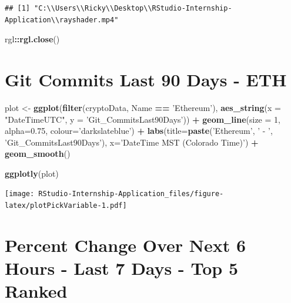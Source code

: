 \documentclass[
]{book}
\newenvironment{Shaded}{\begin{snugshade}}{\end{snugshade}}
\newcommand{\DataTypeTok}[1]{\textcolor[rgb]{0.13,0.29,0.53}{#1}}
\newcommand{\DecValTok}[1]{\textcolor[rgb]{0.00,0.00,0.81}{#1}}
\newcommand{\FloatTok}[1]{\textcolor[rgb]{0.00,0.00,0.81}{#1}}
\newcommand{\KeywordTok}[1]{\textcolor[rgb]{0.13,0.29,0.53}{\textbf{#1}}}
\newcommand{\NormalTok}[1]{#1}
\newcommand{\OperatorTok}[1]{\textcolor[rgb]{0.81,0.36,0.00}{\textbf{#1}}}
\newcommand{\StringTok}[1]{\textcolor[rgb]{0.31,0.60,0.02}{#1}}
\begin{document}
\begin{verbatim}
## [1] "C:\\Users\\Ricky\\Desktop\\RStudio-Internship-Application\\rayshader.mp4"
\end{verbatim}

\begin{Shaded}
\begin{Highlighting}[]
\NormalTok{rgl}\OperatorTok{::}\KeywordTok{rgl.close}\NormalTok{()}
\end{Highlighting}
\end{Shaded}

\hypertarget{git-commits-last-90-days---eth}{%
\section{Git Commits Last 90 Days - ETH}\label{git-commits-last-90-days---eth}}

\begin{Shaded}
\begin{Highlighting}[]
\NormalTok{plot <-}\StringTok{ }\KeywordTok{ggplot}\NormalTok{(}\KeywordTok{filter}\NormalTok{(cryptoData, Name }\OperatorTok{==}\StringTok{ 'Ethereum'}\NormalTok{), }\KeywordTok{aes_string}\NormalTok{(}\DataTypeTok{x =} \StringTok{"DateTimeUTC"}\NormalTok{, }\DataTypeTok{y =} \StringTok{'Git_CommitsLast90Days'}\NormalTok{)) }\OperatorTok{+}
\StringTok{  }
\StringTok{  }\KeywordTok{geom_line}\NormalTok{(}\DataTypeTok{size =} \DecValTok{1}\NormalTok{, }\DataTypeTok{alpha=}\FloatTok{0.75}\NormalTok{, }\DataTypeTok{colour=}\StringTok{'darkslateblue'}\NormalTok{) }\OperatorTok{+}
\StringTok{  }
\StringTok{  }\KeywordTok{labs}\NormalTok{(}\DataTypeTok{title=}\KeywordTok{paste}\NormalTok{(}\StringTok{'Ethereum'}\NormalTok{, }\StringTok{' - '}\NormalTok{, }\StringTok{'Git_CommitsLast90Days'}\NormalTok{),}
       \DataTypeTok{x=}\StringTok{'DateTime MST (Colorado Time)'}\NormalTok{) }\OperatorTok{+}
\StringTok{  }
\StringTok{  }\KeywordTok{geom_smooth}\NormalTok{()}

\KeywordTok{ggplotly}\NormalTok{(plot)}
\end{Highlighting}
\end{Shaded}

\texttt{[image: RStudio-Internship-Application\_files/figure-latex/plotPickVariable-1.pdf]}

\hypertarget{percent-change-over-next-6-hours---last-7-days---top-5-ranked}{%
\section{Percent Change Over Next 6 Hours - Last 7 Days - Top 5 Ranked}\label{percent-change-over-next-6-hours---last-7-days---top-5-ranked}}
\end{document}
